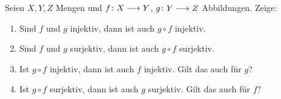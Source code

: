 
\begin{aufg}

  Seien $X,Y,Z$ Mengen und $f\colon X\longrightarrow Y$, $g\colon Y\longrightarrow Z$ Abbildungen. Zeige:
  \begin{enumerate}
    \item Sind $f$ und $g$ injektiv, dann ist auch $g\circ f$ injektiv.
    \item Sind $f$ und $g$ surjektiv, dann ist auch $g\circ f$ surjektiv.
    \item Ist $g\circ f$ injektiv, dann ist auch $f$ injektiv. Gilt das
      auch für $g$?
    \item Ist $g\circ f$ surjektiv, dann ist auch $g$ surjektiv. Gilt das
      auch für $f$?
  \end{enumerate}
  
\end{aufg}
